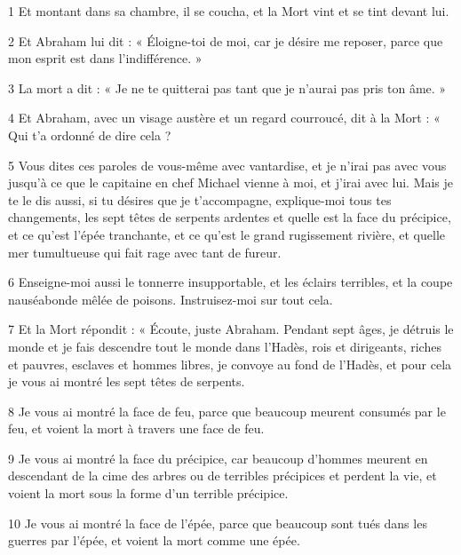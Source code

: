\par 1 Et montant dans sa chambre, il se coucha, et la Mort vint et se tint devant lui.

\par 2 Et Abraham lui dit : « Éloigne-toi de moi, car je désire me reposer, parce que mon esprit est dans l'indifférence. »

\par 3 La mort a dit : « Je ne te quitterai pas tant que je n'aurai pas pris ton âme. »

\par 4 Et Abraham, avec un visage austère et un regard courroucé, dit à la Mort : « Qui t'a ordonné de dire cela ?

\par 5 Vous dites ces paroles de vous-même avec vantardise, et je n'irai pas avec vous jusqu'à ce que le capitaine en chef Michael vienne à moi, et j'irai avec lui. Mais je te le dis aussi, si tu désires que je t'accompagne, explique-moi tous tes changements, les sept têtes de serpents ardentes et quelle est la face du précipice, et ce qu'est l'épée tranchante, et ce qu'est le grand rugissement rivière, et quelle mer tumultueuse qui fait rage avec tant de fureur.

\par 6 Enseigne-moi aussi le tonnerre insupportable, et les éclairs terribles, et la coupe nauséabonde mêlée de poisons. Instruisez-moi sur tout cela.

\par 7 Et la Mort répondit : « Écoute, juste Abraham. Pendant sept âges, je détruis le monde et je fais descendre tout le monde dans l'Hadès, rois et dirigeants, riches et pauvres, esclaves et hommes libres, je convoye au fond de l'Hadès, et pour cela je vous ai montré les sept têtes de serpents.

\par 8 Je vous ai montré la face de feu, parce que beaucoup meurent consumés par le feu, et voient la mort à travers une face de feu.

\par 9 Je vous ai montré la face du précipice, car beaucoup d'hommes meurent en descendant de la cime des arbres ou de terribles précipices et perdent la vie, et voient la mort sous la forme d'un terrible précipice.

\par 10 Je vous ai montré la face de l'épée, parce que beaucoup sont tués dans les guerres par l'épée, et voient la mort comme une épée.


